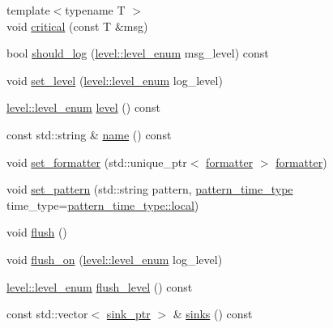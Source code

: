 \begin{DoxyCompactItemize}
\item 
{\footnotesize template$<$typename T $>$ }\\void \hyperlink{classspdlog_1_1logger_a3c5140393ec153b2b8478361aac80eb6}{critical} (const T \&msg)
\item 
bool \hyperlink{classspdlog_1_1logger_a94c77395570c462953ded4188aaaf655}{should\+\_\+log} (\hyperlink{namespacespdlog_1_1level_a35f5227e5daf228d28a207b7b2aefc8b}{level\+::level\+\_\+enum} msg\+\_\+level) const
\item 
void \hyperlink{classspdlog_1_1logger_a403ccd4cd1bc85c6ba6b1517c37726c7}{set\+\_\+level} (\hyperlink{namespacespdlog_1_1level_a35f5227e5daf228d28a207b7b2aefc8b}{level\+::level\+\_\+enum} log\+\_\+level)
\item 
\hyperlink{namespacespdlog_1_1level_a35f5227e5daf228d28a207b7b2aefc8b}{level\+::level\+\_\+enum} \hyperlink{classspdlog_1_1logger_a20dc8198d08c98f84ae10be635108bef}{level} () const
\item 
const std\+::string \& \hyperlink{classspdlog_1_1logger_ac7c6ed0f30ace90402254dc2d3ef1453}{name} () const
\item 
void \hyperlink{classspdlog_1_1logger_a9c5b880ddf9a9c86ec9893364e57071d}{set\+\_\+formatter} (std\+::unique\+\_\+ptr$<$ \hyperlink{classspdlog_1_1formatter}{formatter} $>$ \hyperlink{classspdlog_1_1formatter}{formatter})
\item 
void \hyperlink{classspdlog_1_1logger_a0f61c15b955775652da9b2b813d9f3cd}{set\+\_\+pattern} (std\+::string pattern, \hyperlink{namespacespdlog_ad598fbd8338772e66ae09e8723a07ced}{pattern\+\_\+time\+\_\+type} time\+\_\+type=\hyperlink{namespacespdlog_ad598fbd8338772e66ae09e8723a07cedaf5ddaf0ca7929578b408c909429f68f2}{pattern\+\_\+time\+\_\+type\+::local})
\item 
void \hyperlink{classspdlog_1_1logger_a861bb4d4e65de07966148822075bee86}{flush} ()
\item 
void \hyperlink{classspdlog_1_1logger_a47c021d339c1f246758e1a87a41668e3}{flush\+\_\+on} (\hyperlink{namespacespdlog_1_1level_a35f5227e5daf228d28a207b7b2aefc8b}{level\+::level\+\_\+enum} log\+\_\+level)
\item 
\hyperlink{namespacespdlog_1_1level_a35f5227e5daf228d28a207b7b2aefc8b}{level\+::level\+\_\+enum} \hyperlink{classspdlog_1_1logger_a1b9b7304f017163d181692e41101b648}{flush\+\_\+level} () const
\item 
const std\+::vector$<$ \hyperlink{namespacespdlog_a422c57d3088160b517e5a74e5f318253}{sink\+\_\+ptr} $>$ \& \hyperlink{classspdlog_1_1logger_a00c27f251b795caf028718b605572e1f}{sinks} () const

\end{DoxyCompactItemize}
